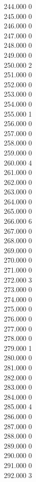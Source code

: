 { 244.000	0 \\
 245.000	0 \\
 246.000	0 \\
 247.000	0 \\
 248.000	0 \\
 249.000	0 \\
 250.000	2 \\
 251.000	0 \\
 252.000	0 \\
 253.000	0 \\
 254.000	0 \\
 255.000	1 \\
 256.000	0 \\
 257.000	0 \\
 258.000	0 \\
 259.000	0 \\
 260.000	4 \\
 261.000	0 \\
 262.000	0 \\
 263.000	0 \\
 264.000	0 \\
 265.000	0 \\
 266.000	6 \\
 267.000	0 \\
 268.000	0 \\
 269.000	0 \\
 270.000	0 \\
 271.000	0 \\
 272.000	3 \\
 273.000	0 \\
 274.000	0 \\
 275.000	0 \\
 276.000	0 \\
 277.000	0 \\
 278.000	0 \\
 279.000	1 \\
 280.000	0 \\
 281.000	0 \\
 282.000	0 \\
 283.000	0 \\
 284.000	0 \\
 285.000	4 \\
 286.000	0 \\
 287.000	0 \\
 288.000	0 \\
 289.000	0 \\
 290.000	0 \\
 291.000	0 \\
 292.000	3 \\
}
